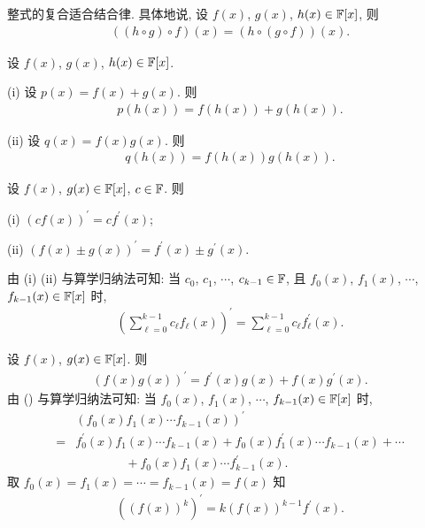 \begin{proposition}
    整式的复合适合结合律. 具体地说, 设 $f(x)$, $g(x)$, $h(x) \in \mathbb{F}[x]$, 则
    \begin{align*}
        ((h \circ g) \circ f)(x) = (h \circ (g \circ f))(x).
    \end{align*}
\end{proposition}

\begin{proposition}
    设 $f(x)$, $g(x)$, $h(x) \in \mathbb{F}[x]$.

    (i) 设 $p(x) = f(x) + g(x)$. 则
    \begin{align*}
        p(h(x)) = f(h(x)) + g(h(x)).
    \end{align*}

    (ii) 设 $q(x) = f(x) g(x)$. 则
    \begin{align*}
        q(h(x)) = f(h(x)) g(h(x)).
    \end{align*}
\end{proposition}

\begin{proposition}
    设 $f(x)$, $g(x) \in \mathbb{F}[x]$, $c \in \mathbb{F}$. 则

    (i) $(cf(x))^{\prime} = c f^{\prime} (x)$;

    (ii) $(f(x) \pm g(x))^{\prime} = f^{\prime} (x) \pm g^{\prime} (x)$.

    由 (i) (ii) 与算学归纳法可知: 当 $c_0$, $c_1$, $\cdots$, $c_{k-1} \in \mathbb{F}$, 且 $f_0 (x)$, $f_1 (x)$, $\cdots$, $f_{k-1} (x) \in \mathbb{F}[x]$ 时,
    \begin{align*}
        \left( \sum_{\ell = 0}^{k-1} c_\ell f_\ell (x) \right)^{\prime} = \sum_{\ell = 0}^{k-1} c_\ell f_\ell^{\prime} (x).
    \end{align*}
\end{proposition}

\begin{proposition}
    设 $f(x)$, $g(x) \in \mathbb{F}[x]$. 则
    \begin{align*}
        (f(x) g(x))^{\prime} = f^{\prime} (x) g(x) + f(x) g^{\prime} (x). \tag*{(\myStar)}
    \end{align*}
    由 (\myStar) 与算学归纳法可知: 当 $f_0 (x)$, $f_1 (x)$, $\cdots$, $f_{k-1} (x) \in \mathbb{F}[x]$ 时,
    \begin{align*}
             & (f_0 (x) f_1 (x) \cdots f_{k-1} (x))^{\prime}                                                      \\
        = {} & f_0^{\prime} (x) f_1 (x) \cdots f_{k-1} (x) + f_0 (x) f_1^{\prime} (x) \cdots f_{k-1} (x) + \cdots \\
             & \qquad \qquad + f_0 (x) f_1 (x) \cdots f_{k-1}^{\prime} (x).
    \end{align*}
    取 $f_0 (x) = f_1 (x) = \cdots = f_{k-1} (x) = f(x)$ 知
    \begin{align*}
        ((f(x))^k)^{\prime} = k(f(x))^{k-1} f^{\prime} (x).
    \end{align*}
\end{proposition}


